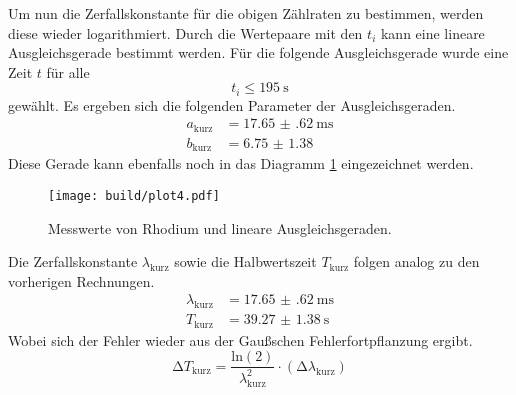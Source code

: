 Um nun die Zerfallskonstante für die obigen Zählraten zu bestimmen, werden diese wieder logarithmiert. Durch die Wertepaare mit den $t_{i}$ kann eine lineare 
Ausgleichsgerade bestimmt werden. Für die folgende Ausgleichsgerade wurde eine Zeit $t$ für alle
\begin{equation*}
t_{i} \leq \SI{195}{\second}
\end{equation*}
gewählt.
Es ergeben sich die folgenden Parameter der Ausgleichsgeraden.
\begin{align}
a_{\text{kurz}} &= \SI{17.65(62)}{\milli\second}\\
b_{\text{kurz}} &= \SI{6.75(138)}{}
\end{align}
Diese Gerade kann ebenfalls noch in das Diagramm \ref{fig:plot4} eingezeichnet werden.
\begin{figure}[ht!]
  \centering
  \texttt{[image: build/plot4.pdf]}
  \caption{Messwerte von Rhodium und lineare Ausgleichsgeraden.}
  \label{fig:plot4}
\end{figure}
Die Zerfallskonstante $\lambda_{\text{kurz}}$ sowie die Halbwertszeit $T_{\text{kurz}}$ folgen analog zu den vorherigen Rechnungen.
\begin{align}
\lambda_{\text{kurz}} &= \SI{17.65(62)}{\milli\second} \\
T_{\text{kurz}} &= \SI{39.27(138)}{\second} 
\end{align}
Wobei sich der Fehler wieder aus der Gaußschen Fehlerfortpflanzung ergibt.
\begin{equation}
\increment T_{\text{kurz}} = \frac{\text{ln}(2)}{\lambda_{\text{kurz}}^{2}} \cdot (\increment \lambda_{\text{kurz}})
\end{equation}